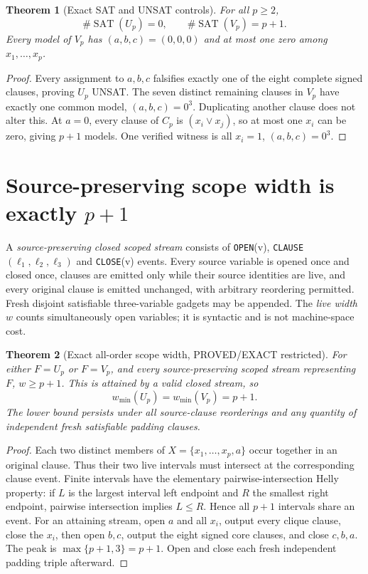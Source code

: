 \documentclass[11pt]{article}
\newtheorem{theorem}{Theorem}
\begin{document}
\begin{theorem}[Exact SAT and UNSAT controls]
For all $p\ge2$,
\[
 \#\operatorname{SAT}(U_p)=0,\qquad
 \#\operatorname{SAT}(V_p)=p+1.
\]
Every model of $V_p$ has $(a,b,c)=(0,0,0)$ and at most one zero among $x_1,\ldots,x_p$.
\end{theorem}
\begin{proof}
Every assignment to $a,b,c$ falsifies exactly one of the eight complete signed clauses, proving $U_p$ UNSAT. The seven distinct remaining clauses in $V_p$ have exactly one common model, $(a,b,c)=0^3$. Duplicating another clause does not alter this. At $a=0$, every clause of $C_p$ is $(x_i\vee x_j)$, so at most one $x_i$ can be zero, giving $p+1$ models. One verified witness is all $x_i=1$, $(a,b,c)=0^3$.
\end{proof}

\section{Source-preserving scope width is exactly $p+1$}
A \emph{source-preserving closed scoped stream} consists of \texttt{OPEN}(v), \texttt{CLAUSE}$(\ell_1,\ell_2,\ell_3)$ and \texttt{CLOSE}(v) events. Every source variable is opened once and closed once, clauses are emitted only while their source identities are live, and every original clause is emitted unchanged, with arbitrary reordering permitted. Fresh disjoint satisfiable three-variable gadgets may be appended. The \emph{live width} $w$ counts simultaneously open variables; it is syntactic and is not machine-space cost.

\begin{theorem}[Exact all-order scope width, PROVED/EXACT restricted]
For either $F=U_p$ or $F=V_p$, and every source-preserving scoped stream representing $F$, $w\ge p+1$. This is attained by a valid closed stream, so
\[
 \boxed{w_{\min}(U_p)=w_{\min}(V_p)=p+1.}
\]
The lower bound persists under all source-clause reorderings and any quantity of independent fresh satisfiable padding clauses.
\end{theorem}
\begin{proof}
Each two distinct members of $X=\{x_1,\ldots,x_p,a\}$ occur together in an original clause. Thus their two live intervals must intersect at the corresponding clause event. Finite intervals have the elementary pairwise-intersection Helly property: if $L$ is the largest interval left endpoint and $R$ the smallest right endpoint, pairwise intersection implies $L\le R$. Hence all $p+1$ intervals share an event. For an attaining stream, open $a$ and all $x_i$, output every clique clause, close the $x_i$, then open $b,c$, output the eight signed core clauses, and close $c,b,a$. The peak is $\max\{p+1,3\}=p+1$. Open and close each fresh independent padding triple afterward.
\end{proof}
\end{document}
